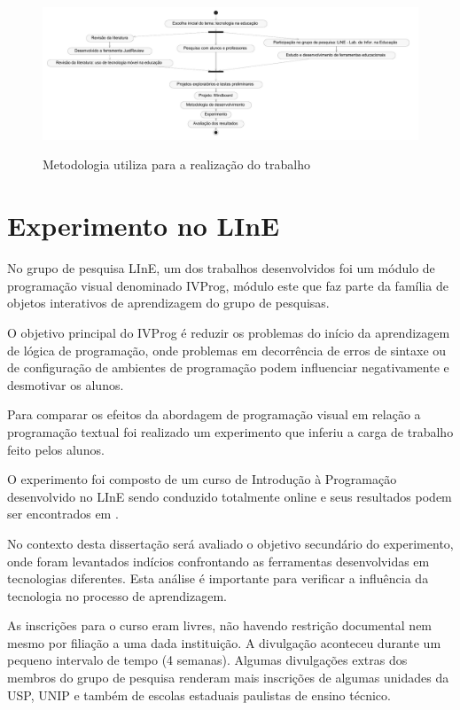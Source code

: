 \begin{figure}[!h]
\centering
\caption{Metodologia utiliza para a realização do trabalho}
\includegraphics[width=1.0\textwidth]{pdfs/metodologia_cropped.pdf} 
\label{fig:metodologia} 
\end{figure}

\section{Experimento no LInE}
\label{sec:metodologia_line}

No grupo de pesquisa LInE, um dos trabalhos desenvolvidos foi um módulo de programação visual denominado IVProg, módulo este que faz parte da família de objetos interativos de aprendizagem do grupo de pesquisas.

O objetivo principal do IVProg é reduzir os problemas do início da aprendizagem de lógica de programação, onde problemas em decorrência de erros de sintaxe ou de configuração de ambientes de programação podem influenciar negativamente e desmotivar os alunos.

Para comparar os efeitos da abordagem de programação visual em relação a programação textual foi realizado um experimento que inferiu a carga de trabalho feito pelos alunos.

O experimento foi composto de um curso de Introdução à Programação desenvolvido no LInE sendo conduzido totalmente online e seus resultados podem ser encontrados em .

No contexto desta dissertação será avaliado o objetivo secundário do experimento, onde foram levantados indícios confrontando as ferramentas desenvolvidas em tecnologias diferentes. Esta análise é importante para verificar a influência da tecnologia no processo de aprendizagem.

As inscrições para o curso eram livres, não havendo restrição documental nem mesmo por filiação a uma dada instituição. A divulgação aconteceu durante um pequeno intervalo de tempo (4 semanas). Algumas divulgações extras dos membros do grupo de pesquisa renderam mais inscrições de algumas unidades da USP, UNIP e também de escolas estaduais paulistas de ensino técnico.

